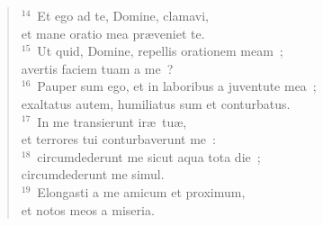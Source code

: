 \begin{flushleft}
\begin{verse}
${}^{14}$~Et ego ad te, Domine, clamavi,\\ et mane oratio mea pr\ae veniet te.\\
${}^{15}$~Ut quid, Domine, repellis orationem meam~;\\ avertis faciem tuam a me~?\\
${}^{16}$~Pauper sum ego, et in laboribus a juventute mea~;\\ exaltatus autem, humiliatus sum et conturbatus.\\
${}^{17}$~In me transierunt ir\ae\ tu\ae ,\\ et terrores tui conturbaverunt me~:\\
${}^{18}$~circumdederunt me sicut aqua tota die~;\\ circumdederunt me simul.\\
${}^{19}$~Elongasti a me amicum et proximum,\\ et notos meos a miseria.\end{verse}\end{flushleft}



